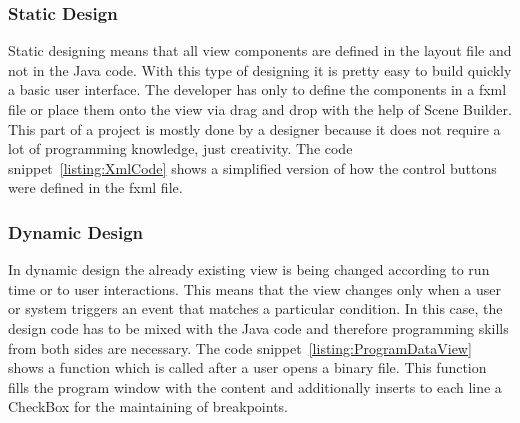 \subsubsection{Static Design}
Static designing means that all view components are defined in the layout file and not in the Java code. With this type of designing it is pretty easy to build quickly a basic user interface. The developer has only to define the components in a fxml file or place them onto the view via drag and drop with the help of Scene Builder. This part of a project is mostly done by a designer because it does not require a lot of programming knowledge, just creativity. The code snippet~\ref{listing:XmlCode} shows a simplified version of how the control buttons were defined in the fxml file.

\subsubsection{Dynamic Design}
In dynamic design the already existing view is being changed according to run time or to user interactions. This means that the view changes only when a user or system triggers an event that matches a particular condition. In this case, the design code has to be mixed with the Java code and therefore programming skills from both sides are necessary. The code snippet~\ref{listing:ProgramDataView} shows a function which is called after a user opens a binary file. This function fills the program window with the content and additionally inserts to each line a CheckBox for the maintaining of breakpoints.

